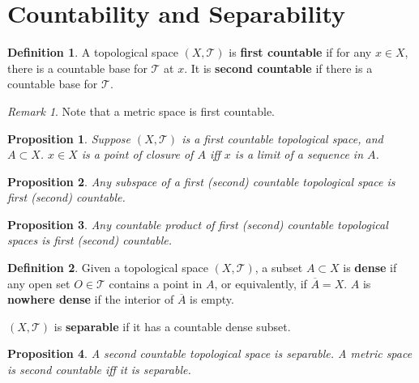 \documentclass[openany]{book}
\newtheorem{proposition}{Proposition}[chapter]
\theoremstyle{definition}
\newtheorem{definition}{Definition}[chapter]
\theoremstyle{remark}
\newtheorem*{remark}{Remark}
\begin{document}
\section{Countability and Separability}
\begin{definition}
    A topological space $(X,\mathcal{T})$ is \textbf{first countable} if for any $x\in X$, there is a countable base for $\mathcal{T}$ at $x$. It is \textbf{second countable} if there is a countable base for $\mathcal{T}$.
\end{definition}
\begin{remark}
    Note that a metric space is first countable.
\end{remark}
\begin{proposition}
    Suppose $(X,\mathcal{T})$ is a first countable topological space, and $A\subset X$. $x\in X$ is a point of closure of $A$ iff $x$ is a limit of a sequence in $A$.
\end{proposition}
\begin{proposition}
    Any subspace of a first (second) countable topological space is first (second) countable.
\end{proposition}
\begin{proposition}
    Any countable product of first (second) countable topological spaces is first (second) countable.
\end{proposition}
\begin{definition}
    Given a topological space $(X,\mathcal{T})$, a subset $A\subset X$ is \textbf{dense} if any open set $O\in \mathcal{T}$ contains a point in $A$, or equivalently, if $\overline{A}=X$. $A$ is \textbf{nowhere dense} if the interior of $\overline{A}$ is empty.

    $(X,\mathcal{T})$ is \textbf{separable} if it has a countable dense subset.
\end{definition}
\begin{proposition}
    A second countable topological space is separable. A metric space is second countable iff it is separable.
\end{proposition}
\end{document}
